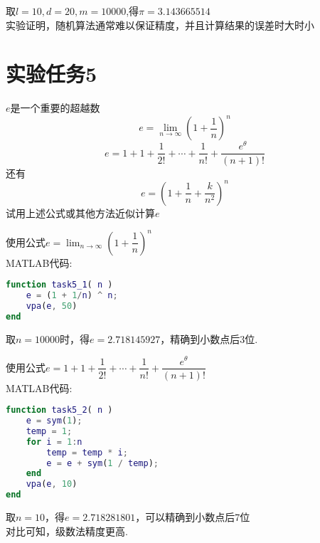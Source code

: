 \documentclass[12pt]{article}
\begin{document}
\begin{CJK*}{UTF8}{gbsn}
	取$l=10,d=20,m=10000$,得$\pi=3.143665514$	\\
	实验证明，随机算法通常难以保证精度，并且计算结果的误差时大时小\\

\section{实验任务5}
	$e$是一个重要的超越数\\
	$$e=\lim_{n\to\infty}\left(1+\dfrac{1}{n}\right)^n$$
	$$e=1+1+\dfrac{1}{2!}+\cdots+\dfrac{1}{n!}+\dfrac{e^\theta}{(n+1)!}$$
	还有\\
	$$e=\left(1+\dfrac{1}{n}+\dfrac{k}{n^2}\right)^n$$
	试用上述公式或其他方法近似计算$e$
	
	使用公式$\displaystyle e=\lim_{n\to\infty}\left(1+\dfrac{1}{n}\right)^n$\\
	MATLAB代码:
	\begin{lstlisting}[language=matlab]
function task5_1( n )   
    e = (1 + 1/n) ^ n;
    vpa(e, 50)
end
	\end{lstlisting}
	
	取$n=10000$时，得$e=2.718145927$，精确到小数点后3位.
	
	使用公式$e=1+1+\dfrac{1}{2!}+\cdots+\dfrac{1}{n!}+\dfrac{e^\theta}{(n+1)!}$\\
	MATLAB代码:
	\begin{lstlisting}[language=matlab]
function task5_2( n )
    e = sym(1);
    temp = 1;
    for i = 1:n
        temp = temp * i;
        e = e + sym(1 / temp);
    end
    vpa(e, 10)
end
	\end{lstlisting}
	取$n=10$，得$e=2.718281801$，可以精确到小数点后7位\\
	对比可知，级数法精度更高.	
\end{CJK*}
\end{document}
